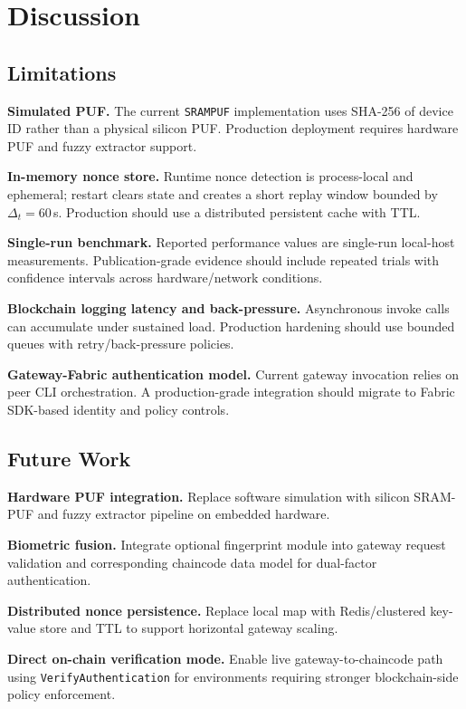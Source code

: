 \documentclass[conference]{IEEEtran}
\begin{document}
\section{Discussion}
\label{sec:discuss}

\subsection{Limitations}

\textbf{Simulated PUF.} The current \texttt{SRAMPUF} implementation uses SHA-256 of device ID rather than a physical silicon PUF. Production deployment requires hardware PUF and fuzzy extractor support.

\textbf{In-memory nonce store.} Runtime nonce detection is process-local and ephemeral; restart clears state and creates a short replay window bounded by $\Delta_t=60$\,s. Production should use a distributed persistent cache with TTL.

\textbf{Single-run benchmark.} Reported performance values are single-run local-host measurements. Publication-grade evidence should include repeated trials with confidence intervals across hardware/network conditions.

\textbf{Blockchain logging latency and back-pressure.} Asynchronous invoke calls can accumulate under sustained load. Production hardening should use bounded queues with retry/back-pressure policies.

\textbf{Gateway-Fabric authentication model.} Current gateway invocation relies on peer CLI orchestration. A production-grade integration should migrate to Fabric SDK-based identity and policy controls.

\subsection{Future Work}

\textbf{Hardware PUF integration.} Replace software simulation with silicon SRAM-PUF and fuzzy extractor pipeline on embedded hardware.

\textbf{Biometric fusion.} Integrate optional fingerprint module into gateway request validation and corresponding chaincode data model for dual-factor authentication.

\textbf{Distributed nonce persistence.} Replace local map with Redis/clustered key-value store and TTL to support horizontal gateway scaling.

\textbf{Direct on-chain verification mode.} Enable live gateway-to-chaincode path using \texttt{VerifyAuthentication} for environments requiring stronger blockchain-side policy enforcement.
\end{document}
